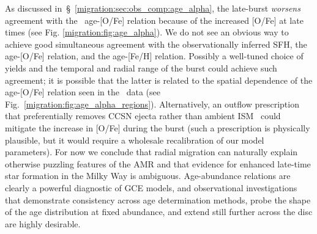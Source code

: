 As discussed in~\S~\ref{migration:sec:obs_comp:age_alpha}, the late-burst 
\textit{worsens} agreement with the~\citet{Feuillet2018, Feuillet2019} 
age-[O/Fe] relation because of the increased [O/Fe] at late times (see Fig. 
\ref{migration:fig:age_alpha}). 
We do not see an obvious way to achieve good simultaneous agreement with the 
observationally inferred SFH, the age-[O/Fe] relation, and the age-[Fe/H] 
relation. 
Possibly a well-tuned choice of yields and the temporal and radial range of 
the burst could achieve such agreement; it is possible that the latter is 
related to the spatial dependence of the age-[O/Fe] relation seen in 
the~\citet{Feuillet2019} data (see Fig.~\ref{migration:fig:age_alpha_regions}). 
Alternatively, an outflow prescription that preferentially removes CCSN 
ejecta rather than ambient ISM~\citep[see, e.g.,][]{Vincenzo2016b,
Chisholm2018, Christensen2018} could mitigate the increase in [O/Fe] during
the burst (such a 
prescription is physically plausible, but it would require a wholesale 
recalibration of our model parameters). 
For now we conclude that radial migration can naturally explain otherwise 
puzzling features of the AMR and that evidence for enhanced late-time star 
formation in the Milky Way is ambiguous. 
Age-abundance relations are clearly a powerful diagnostic of GCE models, and 
observational investigations that demonstrate consistency across age 
determination methods, probe the shape of the age distribution at fixed 
abundance, and extend still further across the disc are highly desirable. 

